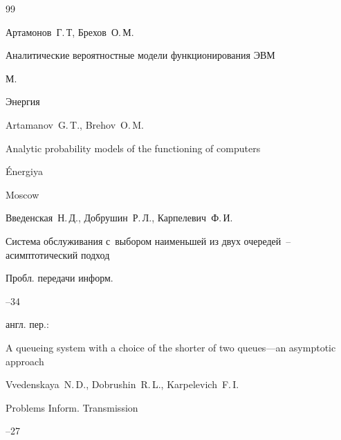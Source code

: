 \begin{thebibliography}{99}




\by Артамонов~Г.\,Т, Брехов~О.\,М.

\book Аналитические вероятностные модели функционирования ЭВМ

\publaddr М.

\publ Энергия



\misctransl

\by Artamanov~G.\,T., Brehov~O.\,M. 

\book Analytic probability models of the functioning of computers

\publ \'Energiya

\publaddr Moscow






\by    Введенская~Н.\,Д., Добрушин~Р.\,Л., Карпелевич~Ф.\,И.

\paper Система обслуживания с~выбором наименьшей из двух очередей~-- асимптотический подход

\jour Пробл. передачи информ.




--34




\transl англ. пер.:~

\paper A queueing system with a choice of the shorter of two queues—an asymptotic approach

\by Vvedenskaya~N.\,D., Dobrushin~R.\,L., Karpelevich~F.\,I. 

\jour Problems Inform. Transmission




--27




\end{thebibliography}

